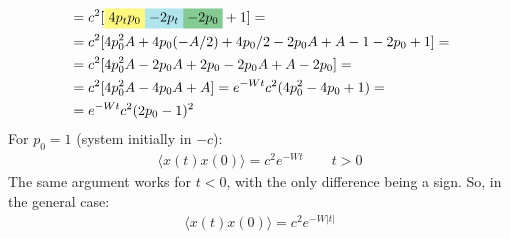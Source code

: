 \documentclass[../template.tex]{subfiles}
\begin{document}
\begin{exo}
\begin{align*}
        &= c^2 [\hlc{Yellow}{4 p_t p_0 }\hlc{SkyBlue}{- 2p_t} \hlc{ForestGreen}{- 2p_0 }+1] =\\
        &= c^2[4p_0^2 A + 4p_0 (-A/2) + 4p_0 /2 - 2p_0A + A -1 - 2p_0 +1] =\\
        &=c^2[4 p_0^2 A - 2p_0 A + 2p_0 - 2p_0A + A - 2p_0] =\\
        &= c^2[4p_0^2 A - 4p_0 A + A] = e^{-Wt}c^2 (4p_0^2 - 4p_0 + 1) =\\
        &= e^{-Wt} c^2 (2p_0-1)^2
    \end{align*}
    For $p_0 = 1$ (system initially in $-c$): 
    \begin{align*}
        \langle x(t) x(0) \rangle = c^2e^{-Wt}  \qquad t>0
    \end{align*}
    The same argument works for $t < 0$, with the only difference being a sign. So, in the general case:
    \begin{align*}
        \langle x(t) x(0)\rangle = c^2e^{-W|t|}
    \end{align*}

\end{exo}
\end{document}
